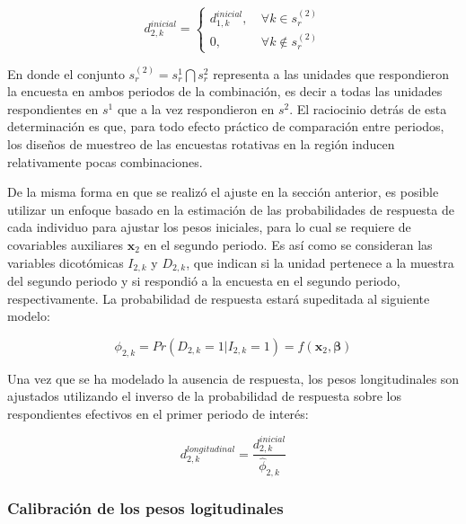 \documentclass[
  10pt,
  spanish,
]{book}
\begin{document}
\begin{equation*}
d_{2, k}^{inicial} =
\begin{cases}
d_{1, k}^{inicial}, &\ \forall k \in s_r^{(2)}  \\
0, &\ \forall k \notin s_r^{(2)}
\end{cases}
\end{equation*}

En donde el conjunto \(s_r^{(2)} = s_r^1 \boldsymbol\bigcap s_r^2\) representa a las unidades que respondieron la encuesta en ambos periodos de la combinación, es decir a todas las unidades respondientes en \(s^1\) que a la vez respondieron en \(s^2\). El raciocinio detrás de esta determinación es que, para todo efecto práctico de comparación entre periodos, los diseños de muestreo de las encuestas rotativas en la región inducen relativamente pocas combinaciones.

De la misma forma en que se realizó el ajuste en la sección anterior, es posible utilizar un enfoque basado en la estimación de las probabilidades de respuesta de cada individuo para ajustar los pesos iniciales, para lo cual se requiere de covariables auxiliares \(\mathbf{x}_{2}\) en el segundo periodo. Es así como se consideran las variables dicotómicas \(I_{2, k}\) y \(D_{2, k}\), que indican si la unidad pertenece a la muestra del segundo periodo y si respondió a la encuesta en el segundo periodo, respectivamente. La probabilidad de respuesta estará supeditada al siguiente modelo:

\[
\phi_{2, k} = Pr(D_{2, k} = 1|I_{2, k} = 1) = f(\mathbf{x}_{2}, \boldsymbol\beta)
\]

Una vez que se ha modelado la ausencia de respuesta, los pesos longitudinales son ajustados utilizando el inverso de la probabilidad de respuesta sobre los respondientes efectivos en el primer periodo de interés:

\[
d_{2, k}^{longitudinal} = \frac{d_{2, k}^{inicial}}{\hat{\phi}_{2, k} }
\]

\hypertarget{calibraciuxf3n-de-los-pesos-logitudinales}{%
\subsubsection*{Calibración de los pesos logitudinales}\label{calibraciuxf3n-de-los-pesos-logitudinales}}
\end{document}
